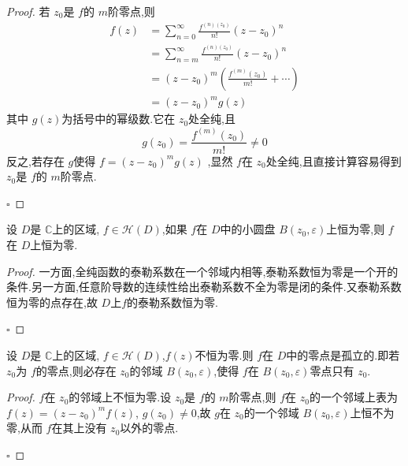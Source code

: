 \documentclass[../../复变函数.tex]{subfiles}
\begin{document}
\begin{proof}
    若 \(  z_0  \)是 \(  f  \)的 \(  m  \)阶零点,则 \[
    \begin{aligned}
    f\left( z \right)&=  \sum _{n = 0}^{\infty} \frac{f^{\left( n \right)\left( z_0 \right)  } }{n! }\left( z-z_0 \right)^{n}\\ 
     &= \sum _{n = m}^{\infty} \frac{f^{\left( n \right)\left( z_0 \right)  } }{n! }\left( z-z_0 \right)^{n}\\ 
      &= \left( z-z_0 \right)^{m} \left( \frac{f^{\left( m \right) }\left( z_0 \right)  }{m! }+ \cdots   \right)\\ 
       &= \left( z-z_0 \right)^{m}g\left( z \right)          
    \end{aligned}
    \]   其中 \(  g\left( z \right)   \)为括号中的幂级数.它在 \(  z_0  \)处全纯,且 \[
    g\left( z_0 \right)= \frac{f^{\left( m \right) }\left( z_0 \right)  }{ m!} \neq 0  
    \]  反之,若存在 \(  g  \)使得 \(  f= \left( z-z_0 \right)^{m}g\left( z \right)    \)  ,显然 \(  f  \)在 \(  z_0  \)处全纯,且直接计算容易得到 \(  z_0  \)是 \(  f  \)的 \(  m  \)阶零点.     

    \hfill $\square$
\end{proof}

\begin{proposition}
    设 \(  D  \)是 \(  \mathbb{C}   \)上的区域, \(  f \in \mathcal{H}\left( D \right)   \),如果 \(  f  \)在 \(  D  \)中的小圆盘 \(  B\left( z_0, \varepsilon  \right)   \)上恒为零,则 \(  f  \)在 \(  D  \)上恒为零.        
\end{proposition}
\begin{proof}
    一方面,全纯函数的泰勒系数在一个邻域内相等,泰勒系数恒为零是一个开的条件.另一方面,任意阶导数的连续性给出泰勒系数不全为零是闭的条件.又泰勒系数恒为零的点存在,故 \(  D  \)上\(  f  \)的泰勒系数恒为零.  

    \hfill $\square$
\end{proof}


\begin{proposition}
    设 \(  D  \)是 \(  \mathbb{C}   \)上的区域, \(  f \in \mathcal{H}\left( D \right)   \),\(  f\left( z \right)   \)不恒为零.则 \(  f  \)在 \(  D  \)中的零点是孤立的.即若 \(  z_0  \)为 \(  f  \)的零点,则必存在 \(  z_0  \)的邻域 \(  B\left( z_0, \varepsilon  \right)   \),使得 \(  f  \)在 \(  B\left( z_0, \varepsilon  \right)   \)零点只有 \(  z_0  \).             
\end{proposition}
\begin{proof}
     \(  f  \)在 \(  z_0  \)的邻域上不恒为零.设 \(  z_0  \)是 \(  f  \)的 \(  m  \)阶零点,则 \(  f  \)在 \(  z_0  \)的一个邻域上表为 \(  f\left( z \right)= \left( z-z_0 \right)^{m}f\left( z \right)     \), \(  g\left( z_0 \right)   \neq 0\),故 \(  g  \)在 \(  z_0  \)的一个邻域 \(  B\left( z_0, \varepsilon  \right)   \)上恒不为零,从而 \(  f  \)在其上没有 \(  z_0  \)以外的零点.              

    \hfill $\square$
\end{proof}
\end{document}
